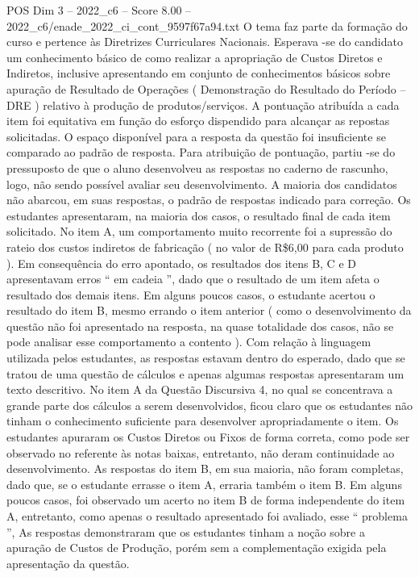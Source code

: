 \begin{textsample}{POS Dim 3 – 2022\_c6 – Score 8.00 – 2022\_c6/enade\_2022\_ci\_cont\_9597f67a94.txt}
O tema faz parte da formação do curso e pertence às Diretrizes Curriculares Nacionais.
Esperava -se do candidato um conhecimento básico de como realizar a apropriação de Custos Diretos e Indiretos, inclusive apresentando em conjunto de conhecimentos básicos sobre apuração de Resultado de Operações ( Demonstração do Resultado do Período – DRE ) relativo à produção de produtos/serviços.
A pontuação atribuída a cada item foi equitativa em função do esforço dispendido para alcançar as repostas solicitadas.
O espaço disponível para a resposta da questão foi insuficiente se comparado ao padrão de resposta.
Para atribuição de pontuação, partiu -se do pressuposto de que o aluno desenvolveu as respostas no caderno de rascunho, logo, não sendo possível avaliar seu desenvolvimento.
A maioria dos candidatos não abarcou, em suas respostas, o padrão de respostas indicado para correção.
Os estudantes apresentaram, na maioria dos casos, o resultado final de cada item solicitado.
No item A, um comportamento muito recorrente foi a supressão do rateio dos custos indiretos de fabricação ( no valor de R\$6,00 para cada produto ).
Em consequência do erro apontado, os resultados dos itens B, C e D apresentavam erros “ em cadeia ”, dado que o resultado de um item afeta o resultado dos demais itens.
Em alguns poucos casos, o estudante acertou o resultado do item B, mesmo errando o item anterior ( como o desenvolvimento da questão não foi apresentado na resposta, na quase totalidade dos casos, não se pode analisar esse comportamento a contento ).
Com relação à linguagem utilizada pelos estudantes, as respostas estavam dentro do esperado, dado que se tratou de uma questão de cálculos e apenas algumas respostas apresentaram um texto descritivo.
No item A da Questão Discursiva 4, no qual se concentrava a grande parte dos cálculos a serem desenvolvidos, ficou claro que os estudantes não tinham o conhecimento suficiente para desenvolver apropriadamente o item.
Os estudantes apuraram os Custos Diretos ou Fixos de forma correta, como pode ser observado no referente às notas baixas, entretanto, não deram continuidade ao desenvolvimento.
As respostas do item B, em sua maioria, não foram completas, dado que, se o estudante errasse o item A, erraria também o item B.
Em alguns poucos casos, foi observado um acerto no item B de forma independente do item A, entretanto, como apenas o resultado apresentado foi avaliado, esse “ problema ”, As respostas demonstraram que os estudantes tinham a noção sobre a apuração de Custos de Produção, porém sem a complementação exigida pela apresentação da questão.

\end{textsample}
